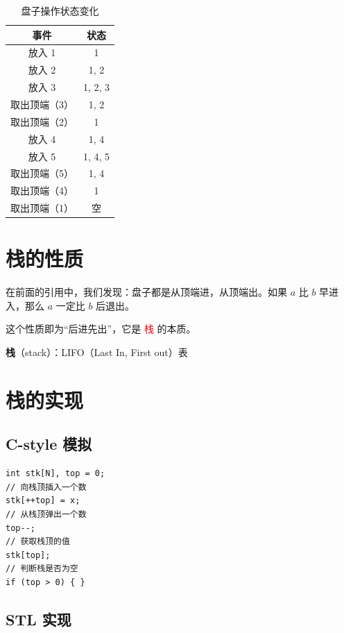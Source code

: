 \documentclass{report}
\begin{document}
\begin{table}[ht]
    \centering
    \begin{tabular}{cc}
        \toprule
        事件          & 状态    \\
        \midrule
        放入 1        & 1       \\
        放入 2        & 1, 2    \\
        放入 3        & 1, 2, 3 \\
        取出顶端（3） & 1, 2    \\
        取出顶端（2） & 1       \\
        放入 4        & 1, 4    \\
        放入 5        & 1, 4, 5 \\
        取出顶端（5） & 1, 4    \\
        取出顶端（4） & 1       \\
        取出顶端（1） & 空      \\
        \bottomrule
    \end{tabular}
    \caption{盘子操作状态变化}
\end{table}

\section{栈的性质}

在前面的引用中，我们发现：盘子都是从顶端进，从顶端出。如果 $a$ 比 $b$ 早进入，那么 $a$ 一定比 $b$ 后退出。

这个性质即为“后进先出”，它是 \textcolor{red}{栈} 的本质。

\textbf{栈}（stack）：LIFO（Last In, First out）表

\section{栈的实现}

\subsection{C-style 模拟}

\begin{verbatim}
int stk[N], top = 0;
// 向栈顶插入一个数
stk[++top] = x;
// 从栈顶弹出一个数
top--;
// 获取栈顶的值
stk[top];
// 判断栈是否为空
if (top > 0) { }
\end{verbatim}

\subsection{STL 实现}
\end{document}

